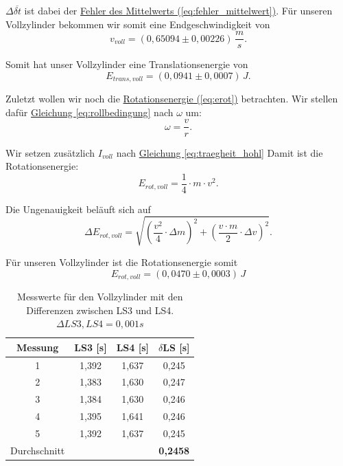 $\Delta \overline{\delta t}$ ist dabei der \hyperref[eq:fehler_mittelwert]{Fehler des Mittelwerts (\ref*{eq:fehler_mittelwert})}. Für unseren Vollzylinder bekommen wir somit eine Endgeschwindigkeit von 
\begin{equation}
    \boxed{
        v_{voll} = (0,65094 \pm 0,00226) \, \frac{m}{s}
    }.
\end{equation}



Somit hat unser Vollzylinder eine Translationsenergie von
\begin{equation}
    \boxed{
        E_{trans,voll} = (0,0941 \pm 0,0007) \, J
    }.
\end{equation}

Zuletzt wollen wir noch die \hyperref[eq:erot]{Rotationsenergie (\ref*{eq:erot})} betrachten. Wir stellen dafür \hyperref[eq:rollbedingung]{Gleichung \ref*{eq:rollbedingung}} nach $\omega$ um:
\begin{equation}
    \omega = \frac{v}{r}.
\end{equation}

Wir setzen zusätzlich $I_{voll}$ nach \hyperref[eq:traegheit_hohl]{Gleichung \ref*{eq:traegheit_hohl}} Damit ist die Rotationsenergie:
\begin{equation}
    E_{rot,voll} = \frac{1}{4} \cdot m \cdot v^2.
\end{equation}

Die Ungenauigkeit beläuft sich auf
\begin{equation}
    \Delta E_{rot,voll} = \sqrt{\left(\frac{v^2}{4} \cdot \Delta m\right)^2 + \left(\frac{v\cdot m}{2} \cdot \Delta v\right)^2}.
\end{equation}

Für unseren Vollzylinder ist die Rotationsenergie somit
\begin{equation}
\boxed{
    E_{rot,voll} = (0,0470 \pm 0,0003) \, J
}
\end{equation}

\begin{table}[!ht]
    \centering
    \begin{tabular}{c | c | c | c}
    \toprule
    Messung & LS3 [s] & LS4 [s] & $\delta$LS [s] \\
    \hline
    1 & 1,392 & 1,637 & 0,245 \\
    2 & 1,383 & 1,630 & 0,247 \\
    3 & 1,384 & 1,630 & 0,246 \\
    4 & 1,395 & 1,641 & 0,246 \\
    5 & 1,392 & 1,637 & 0,245 \\
    \hline
    Durchschnitt &     &     & \textbf{0,2458} \\
    \bottomrule
    \end{tabular}
    \caption{Messwerte für den Vollzylinder mit den Differenzen zwischen LS3 und LS4. $\Delta LS3,LS4 = 0,001s$}
    \label{tab:vollzylinder_ls}
\end{table}



